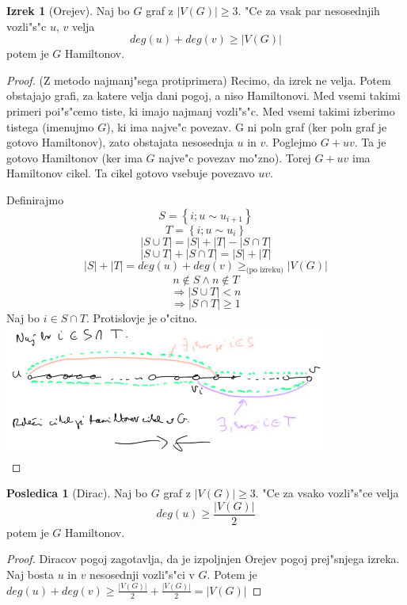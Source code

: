 \documentclass{article}
\theoremstyle{definition}
\newtheorem{conseq}{Posledica}[section]
\newtheorem{theorem}{Izrek}[section]
\begin{document}
	\begin{theorem}[Orejev] %
		Naj bo $G$ graf z $|V(G)| \geq 3$. "Ce za vsak par nesosednjih vozli"s"c $u$, $v$ velja
		$$ deg(u) + deg(v) \geq |V(G)| $$
		potem je $G$ Hamiltonov.
		\begin{proof}(Z metodo najmanj"sega protiprimera)
			Recimo, da izrek ne velja. Potem obstajajo grafi, za katere velja dani pogoj, a niso Hamiltonovi. Med vsemi takimi primeri poi"s"cemo tiste, ki imajo najmanj vozli"s"c. Med vsemi takimi izberimo tistega (imenujmo $G$), ki ima najve"c povezav.
			G ni poln graf (ker poln graf je gotovo Hamiltonov), zato obstajata nesosednja $u$ in $v$. Poglejmo $G + uv$. %
			Ta je gotovo Hamiltonov (ker ima $G$ najve"c povezav mo"zno). Torej $G+uv$ ima Hamiltonov cikel. Ta cikel gotovo vsebuje povezavo $uv$. %
			
			Definirajmo
			$$ S = \left\lbrace i; u \sim u_{i+1} \right\rbrace $$
			$$ T = \left\lbrace i; u \sim u_i \right\rbrace $$
			$$ |S \cup T| = |S| + |T| - |S \cap T| $$
			$$ |S \cup T| + |S \cap T| = |S| + |T| $$
			$$ |S| + |T| = deg(u) + deg(v) \geq_{\text{(po izreku)}} |V(G)| $$
			$$ n \not\in S \land n \not\in T $$
			$$ \Rightarrow |S \cup T| < n $$
			$$ \Rightarrow |S \cap T| \geq 1 $$
			Naj bo $i \in S \cap T$. Protislovje je o"citno.\\
			\includegraphics{orejev-izrek} \\
		\end{proof}
	\end{theorem}

	\begin{conseq}[Dirac] %
		Naj bo $G$ graf z $|V(G)| \geq 3$. "Ce za vsako vozli"s"ce velja
		$$ deg(u) \geq \frac{|V(G)|}{2} $$
		potem je $G$ Hamiltonov.
		\begin{proof}
			Diracov pogoj zagotavlja, da je izpoljnjen Orejev pogoj prej"snjega izreka. Naj bosta $u$ in $v$ nesosednji vozli"s"ci v $G$. Potem je $deg(u) + deg(v) \geq \frac{|V(G)|}{2} + \frac{|V(G)|}{2} = |V(G)|$
		\end{proof}
	\end{conseq}
\end{document}
